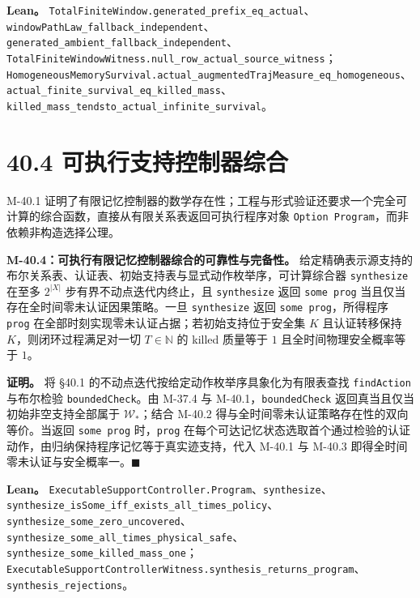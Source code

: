 \documentclass[
  11pt,
  oneside]{book}
\begin{document}
\textbf{Lean。} \nolinkurl{TotalFiniteWindow.generated_prefix_eq_actual}、\nolinkurl{windowPathLaw_fallback_independent}、\nolinkurl{generated_ambient_fallback_independent}、\nolinkurl{TotalFiniteWindowWitness.null_row_actual_source_witness}；\nolinkurl{HomogeneousMemorySurvival.actual_augmentedTrajMeasure_eq_homogeneous}、\nolinkurl{actual_finite_survival_eq_killed_mass}、\nolinkurl{killed_mass_tendsto_actual_infinite_survival}。

\section{40.4 可执行支持控制器综合}\label{ux53efux6267ux884cux652fux6301ux63a7ux5236ux5668ux7efcux5408}

M-40.1 证明了有限记忆控制器的数学存在性；工程与形式验证还要求一个完全可计算的综合函数，直接从有限关系表返回可执行程序对象 \nolinkurl{Option Program}，而非依赖非构造选择公理。

\hypertarget{m-40-4}{}\label{m-40-4}

\textbf{M-40.4：可执行有限记忆控制器综合的可靠性与完备性。} 给定精确表示源支持的布尔关系表、认证表、初始支持表与显式动作枚举序，可计算综合器 \texttt{synthesize} 在至多 \(2^{|X|}\) 步有界不动点迭代内终止，且 \texttt{synthesize} 返回 \texttt{some\ prog} 当且仅当存在全时间零未认证因果策略。一旦 \texttt{synthesize} 返回 \texttt{some\ prog}，所得程序 \texttt{prog} 在全部时刻实现零未认证占据；若初始支持位于安全集 \(K\) 且认证转移保持 \(K\)，则闭环过程满足对一切 \(T\in\mathbb N\) 的 killed 质量等于 \(1\) 且全时间物理安全概率等于 \(1\)。

\textbf{证明。} 将 §40.1 的不动点迭代按给定动作枚举序具象化为有限表查找 \texttt{findAction} 与布尔检验 \texttt{boundedCheck}。由 M-37.4 与 M-40.1，\texttt{boundedCheck} 返回真当且仅当初始非空支持全部属于 \(\mathcal W_*\)；结合 M-40.2 得与全时间零未认证策略存在性的双向等价。当返回 \texttt{some\ prog} 时，\texttt{prog} 在每个可达记忆状态选取首个通过检验的认证动作，由归纳保持程序记忆等于真实迹支持，代入 M-40.1 与 M-40.3 即得全时间零未认证与安全概率一。\(\blacksquare\)

\textbf{Lean。} \nolinkurl{ExecutableSupportController.Program}、\texttt{synthesize}、\nolinkurl{synthesize_isSome_iff_exists_all_times_policy}、\nolinkurl{synthesize_some_zero_uncovered}、\nolinkurl{synthesize_some_all_times_physical_safe}、\nolinkurl{synthesize_some_killed_mass_one}；\nolinkurl{ExecutableSupportControllerWitness.synthesis_returns_program}、\nolinkurl{synthesis_rejections}。
\end{document}
